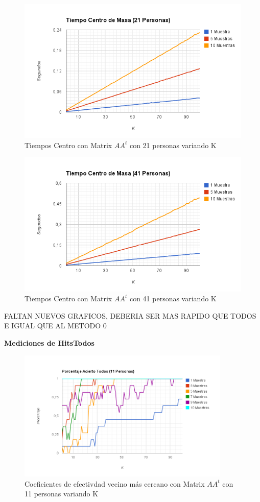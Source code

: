 \begin{figure}[H]
\includegraphics[width=1\textwidth]{img/imageh.png}
     \caption{Tiempos Centro con Matrix $AA^t$ con 21 personas variando K}
\end{figure}

\begin{figure}[H]
\includegraphics[width=1\textwidth]{img/imagei.png}
     \caption{Tiempos Centro con Matrix $AA^t$ con 41 personas variando K}
\end{figure}

FALTAN NUEVOS GRAFICOS, DEBERIA SER MAS RAPIDO QUE TODOS E IGUAL QUE AL METODO 0

\textbf{Mediciones de HitsTodos}

\begin{figure}[H]
\includegraphics[width=0.9\textwidth]{img/imagej.png}
     \caption{Coeficientes de efectivdad vecino más cercano con Matrix $AA^t$ con 11 personas variando K}
\end{figure}

